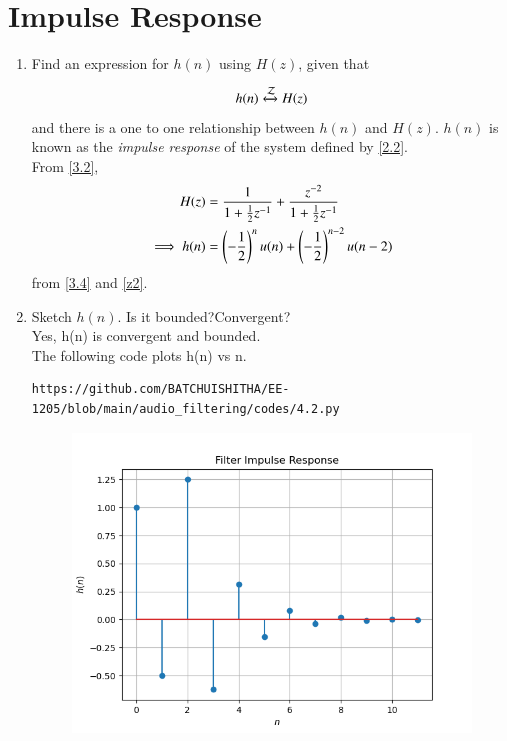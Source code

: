 \documentclass[journal,12pt,twocolumn]{IEEEtran}
\newcommand{\systemZ}[1]{\stackrel{#1}{\mathcal{Z}}}
\theoremstyle{remark}
\begin{document}
\section{Impulse Response}
\begin{enumerate}[label=\thesection.\arabic*]
\item \label{prob:impulse_resp}
Find an expression for $h(n)$ using $H(z)$, given that 
\begin{equation}
h(n) \xleftrightarrow{\systemZ{}} H(z)  \label{4.1}
\end{equation}
and there is a one to one relationship between $h(n)$ and $H(z)$. $h(n)$ is known as the {\em impulse response} of the
system defined by \eqref{2.2}.\\
\solution From \eqref{3.2},
\begin{align}
H(z) &= \frac{1}{1 + \frac{1}{2}z^{-1}} + \frac{ z^{-2}}{1 + \frac{1}{2}z^{-1}}
\\
\implies h(n) &= \left(-\frac{1}{2}\right)^{n}u(n) + \left(-\frac{1}{2}\right)^{n-2}u(n-2)
\end{align}
from \eqref{3.4} and \eqref{z2}.
\item Sketch $h(n)$. Is it bounded?Convergent?\\
\solution
Yes, h(n) is convergent and bounded.\\
The following code plots h(n) vs n.
\begin{lstlisting}
https://github.com/BATCHUISHITHA/EE-1205/blob/main/audio_filtering/codes/4.2.py
\end{lstlisting}
\begin{figure}[ht]
	\centering
	\includegraphics[width=\columnwidth]{figs/4.2.png}

\end{figure}
\end{enumerate}
\end{document}
